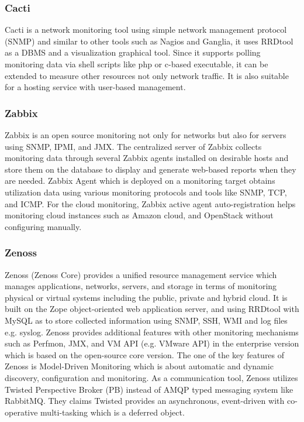 \documentclass{sig-alternate-05-2015}
\begin{document}
\subsubsection{Cacti}
Cacti is a network monitoring tool using simple network management protocol (SNMP) and similar to other tools such as Nagios and Ganglia, it uses RRDtool as a DBMS and a visualization graphical tool. Since it supports polling monitoring data via shell scripts like php or c-based executable, it can be extended to measure other resources not only network traffic. It is also suitable for a hosting service with user-based management.

\subsubsection{Zabbix}

Zabbix is an open source monitoring not only for networks but also for servers using SNMP, IPMI, and JMX. The centralized server of Zabbix collects monitoring data through several Zabbix agents installed on desirable hosts and store them on the database to display and generate web-based reports when they are needed. Zabbix Agent which is deployed on a monitoring target obtains utilization data using various monitoring protocols and tools like SNMP, TCP, and ICMP. For the cloud monitoring, Zabbix active agent auto-registration helps monitoring cloud instances such as Amazon cloud, and OpenStack without configuring manually.

\subsubsection{Zenoss}

Zenoss (Zenoss Core) provides a unified resource management service which manages applications, networks, servers, and storage in terms of monitoring physical or virtual systems including the public, private and hybrid cloud. It is built on the Zope object-oriented web application server, and using RRDtool with MySQL as to store collected information using SNMP, SSH, WMI and log files e.g. syslog. Zenoss provides additional features with other monitoring mechanisms such as Perfmon, JMX, and VM API (e.g. VMware API) in the enterprise version which is based on the open-source core version. The one of the key features of Zenoss is Model-Driven Monitoring which is about automatic and dynamic discovery, configuration and monitoring. As a communication tool, Zenoss utilizes Twisted Perspective Broker (PB) instead of AMQP typed messaging system like RabbitMQ. They claims Twisted provides an asynchronous, event-driven with co-operative multi-tasking which is a deferred object.
\end{document}
